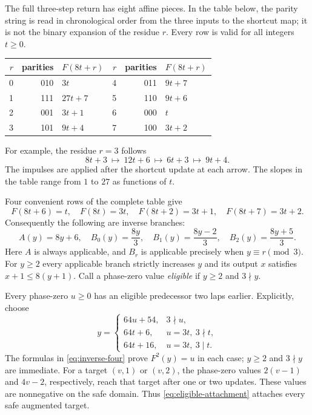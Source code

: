 The full three-step return has eight affine pieces.  In the table below,
the parity string is read in chronological order from the three inputs
to the shortcut map; it is not the binary expansion of the residue $r$.
Every row is valid for all integers $t\ge0$.
\begin{center}
\begin{tabular}{rrl|rrl}\toprule
$r$&parities&$F(8t+r)$&$r$&parities&$F(8t+r)$\\\midrule
0&010&$3t$&4&011&$9t+7$\\
1&111&$27t+7$&5&110&$9t+6$\\
2&001&$3t+1$&6&000&$t$\\
3&101&$9t+4$&7&100&$3t+2$\\\bottomrule
\end{tabular}
\end{center}
For example, the residue $r=3$ follows
\[
 8t+3\ \longmapsto\ 12t+6\ \longmapsto\ 6t+3
 \ \longmapsto\ 9t+4.
\]
The impulses are applied after the shortcut update at each arrow.
The slopes in the table range from $1$ to $27$ as functions of $t$.

Four convenient rows of the complete table give
\begin{equation}\label{eq:inverse-four}
 F(8t+6)=t,\quad F(8t)=3t,\quad
 F(8t+2)=3t+1,\quad F(8t+7)=3t+2.
\end{equation}
Consequently the following are inverse branches:
\[
 A(y)=8y+6,\quad B_0(y)=\frac{8y}{3},\quad
 B_1(y)=\frac{8y-2}{3},\quad B_2(y)=\frac{8y+5}{3}.
\]
Here $A$ is always applicable, and $B_r$ is applicable precisely when
$y\equiv r\pmod3$. For $y\ge2$ every applicable branch strictly increases
$y$ and its output $x$ satisfies $x+1\le8(y+1)$. Call a phase-zero value
\emph{eligible} if $y\ge2$ and $3\nmid y$.

Every phase-zero $u\ge0$ has an eligible predecessor two laps earlier.
Explicitly, choose
\begin{equation}\label{eq:eligible-attachment}
 y=\begin{cases}
 64u+54,&3\nmid u,\\
 64t+6,&u=3t,\ 3\nmid t,\\
 64t+16,&u=3t,\ 3\mid t.
 \end{cases}
\end{equation}
The formulas in \eqref{eq:inverse-four} prove $F^2(y)=u$ in each case;
$y\ge2$ and $3\nmid y$ are immediate. For a target $(v,1)$ or $(v,2)$,
the phase-zero values $2(v-1)$ and $4v-2$, respectively, reach that target
after one or two updates. These values are nonnegative on the safe domain.
Thus \eqref{eq:eligible-attachment} attaches every safe augmented target.

